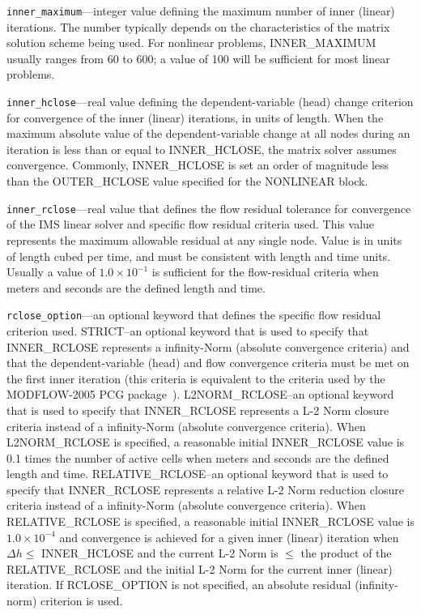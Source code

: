 \begin{description}
\item \texttt{inner\_maximum}---integer value defining the maximum number of inner (linear) iterations. The number typically depends on the characteristics of the matrix solution scheme being used. For nonlinear problems, INNER\_MAXIMUM usually ranges from 60 to 600; a value of 100 will be sufficient for most linear problems.

\item \texttt{inner\_hclose}---real value defining the dependent-variable (head) change criterion for convergence of the inner (linear) iterations, in units of length. When the maximum absolute value of the dependent-variable change at all nodes during an iteration is less than or equal to INNER\_HCLOSE, the matrix solver assumes convergence. Commonly, INNER\_HCLOSE is set an order of magnitude less than the OUTER\_HCLOSE value specified for the NONLINEAR block.

\item \texttt{inner\_rclose}---real value that defines the flow residual tolerance for convergence of the IMS linear solver and specific flow residual criteria used. This value represents the maximum allowable residual at any single node.  Value is in units of length cubed per time, and must be consistent with \mf length and time units. Usually a value of $1.0 \times 10^{-1}$ is sufficient for the flow-residual criteria when meters and seconds are the defined \mf length and time.

\item \texttt{rclose\_option}---an optional keyword that defines the specific flow residual criterion used.  STRICT--an optional keyword that is used to specify that INNER\_RCLOSE represents a infinity-Norm (absolute convergence criteria) and that the dependent-variable (head) and flow convergence criteria must be met on the first inner iteration (this criteria is equivalent to the criteria used by the MODFLOW-2005 PCG package~\citep{hill1990preconditioned}). L2NORM\_RCLOSE--an optional keyword that is used to specify that INNER\_RCLOSE represents a L-2 Norm closure criteria instead of a infinity-Norm (absolute convergence criteria). When L2NORM\_RCLOSE is specified, a reasonable initial INNER\_RCLOSE value is 0.1 times the number of active cells when meters and seconds are the defined \mf length and time.  RELATIVE\_RCLOSE--an optional keyword that is used to specify that INNER\_RCLOSE represents a relative L-2 Norm reduction closure criteria instead of a infinity-Norm (absolute convergence criteria). When RELATIVE\_RCLOSE is specified, a reasonable initial INNER\_RCLOSE value is $1.0 \times 10^{-4}$ and convergence is achieved for a given inner (linear) iteration when $\Delta h \le$ INNER\_HCLOSE and the current L-2 Norm is $\le$ the product of the RELATIVE\_RCLOSE and the initial L-2 Norm for the current inner (linear) iteration. If RCLOSE\_OPTION is not specified, an absolute residual (infinity-norm) criterion is used.


\end{description}
